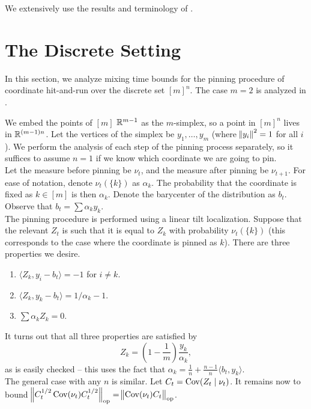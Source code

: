 \documentclass{article}
\begin{document}
\titleBC
\thispagestyle{empty}

\vspace{20pt}

We extensively use the results and terminology of \cite{loc-schemes}.

\section{The Discrete Setting}

In this section, we analyze mixing time bounds for the pinning procedure of coordinate hit-and-run over the discrete set $[m]^n$. The case $m=2$ is analyzed in \cite{alog20,loc-schemes}.

We embed the points of $[m]$ $\mathbb{R}^{m-1}$ as the $m$-simplex, so a point in $[m]^n$ lives in $\mathbb{R}^{(m-1)n}$. Let the vertices of the simplex be $y_1,\ldots,y_m$ (where $\norm{y_i}^2 = 1$ for all $i$). We perform the analysis of each step of the pinning process separately, so it suffices to assume $n=1$ if we know which coordinate we are going to pin.\\
Let the measure before pinning be $\nu_t$, and the measure after pinning be $\nu_{t+1}$.
For ease of notation, denote $\nu_t(\{k\})$ as $\alpha_k$. The probability that the coordinate is fixed as $k \in [m]$ is then $\alpha_k$. Denote the barycenter of the distribution as $b_t$. Observe that $b_t = \sum \alpha_k y_k$. \\ 
The pinning procedure is performed using a linear tilt localization. Suppose that the relevant $Z_t$ is such that it is equal to $Z_k$ with probability $\nu_t(\{k\})$ (this corresponds to the case where the coordinate is pinned as $k$). There are three properties we desire.
\begin{enumerate}
	\item $\langle Z_k , y_i - b_t \rangle = -1$ for $i \ne k$.
	\item $\langle Z_k , y_k - b_t \rangle = 1/\alpha_k - 1$.
	\item $\sum \alpha_k Z_k = 0$.
\end{enumerate}

It turns out that all three properties are satisfied by
\[ Z_k = \left( 1 - \frac{1}{m} \right) \frac{y_k}{\alpha_k}, \]
as is easily checked -- this uses the fact that $\alpha_k = \frac{1}{n} + \frac{n-1}{n} \langle b_t , y_k \rangle$.\\

The general case with any $n$ is similar. Let $C_t = \operatorname{Cov}(Z_t \mid \nu_t)$. It remains now to bound $\norm{C_t^{1/2} \operatorname{Cov}(\nu_t) C_t^{1/2}}_\text{op} = \norm{\operatorname{Cov}(\nu_t) C_t}_\text{op}$.%

\clearpage



\end{document}
